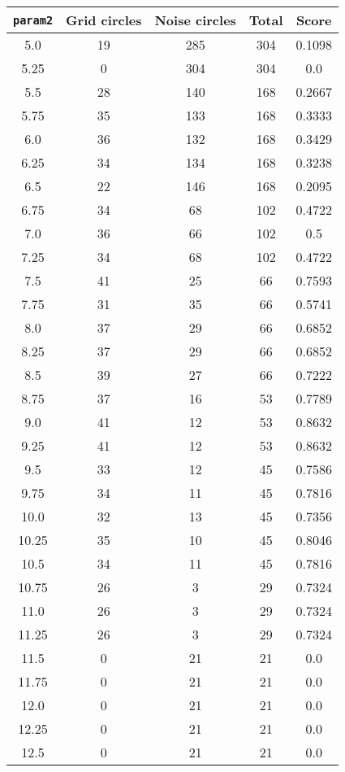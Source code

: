 \documentclass[letterpaper, 12pt]{article}
\begin{document}
\begin{longtable}{|c|c|c|c|c|}
\hline
\textbf{\texttt{param2}} & \textbf{Grid circles} & \textbf{Noise circles} & \textbf{Total} & \textbf{Score} \\
\hline
5.0 & 19 & 285 & 304 & 0.1098 \\
\hline
5.25 & 0 & 304 & 304 & 0.0 \\
\hline
5.5 & 28 & 140 & 168 & 0.2667 \\
\hline
5.75 & 35 & 133 & 168 & 0.3333 \\
\hline
6.0 & 36 & 132 & 168 & 0.3429 \\
\hline
6.25 & 34 & 134 & 168 & 0.3238 \\
\hline
6.5 & 22 & 146 & 168 & 0.2095 \\
\hline
6.75 & 34 & 68 & 102 & 0.4722 \\
\hline
7.0 & 36 & 66 & 102 & 0.5 \\
\hline
7.25 & 34 & 68 & 102 & 0.4722 \\
\hline
7.5 & 41 & 25 & 66 & 0.7593 \\
\hline
7.75 & 31 & 35 & 66 & 0.5741 \\
\hline
8.0 & 37 & 29 & 66 & 0.6852 \\
\hline
8.25 & 37 & 29 & 66 & 0.6852 \\
\hline
8.5 & 39 & 27 & 66 & 0.7222 \\
\hline
8.75 & 37 & 16 & 53 & 0.7789 \\
\hline
9.0 & 41 & 12 & 53 & 0.8632 \\
\hline
9.25 & 41 & 12 & 53 & 0.8632 \\
\hline
9.5 & 33 & 12 & 45 & 0.7586 \\
\hline
9.75 & 34 & 11 & 45 & 0.7816 \\
\hline
10.0 & 32 & 13 & 45 & 0.7356 \\
\hline
10.25 & 35 & 10 & 45 & 0.8046 \\
\hline
10.5 & 34 & 11 & 45 & 0.7816 \\
\hline
10.75 & 26 & 3 & 29 & 0.7324 \\
\hline
11.0 & 26 & 3 & 29 & 0.7324 \\
\hline
11.25 & 26 & 3 & 29 & 0.7324 \\
\hline
11.5 & 0 & 21 & 21 & 0.0 \\
\hline
11.75 & 0 & 21 & 21 & 0.0 \\
\hline
12.0 & 0 & 21 & 21 & 0.0 \\
\hline
12.25 & 0 & 21 & 21 & 0.0 \\
\hline
12.5 & 0 & 21 & 21 & 0.0 \\

\end{longtable}
\end{document}
